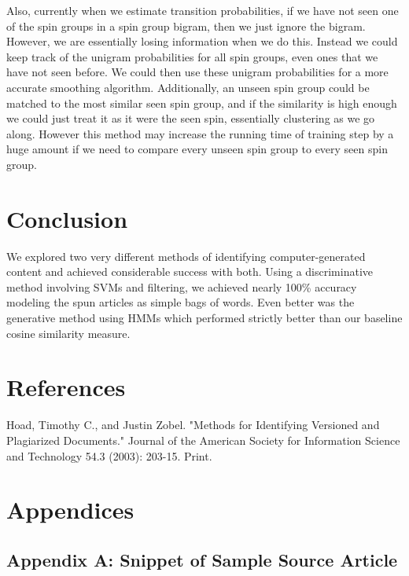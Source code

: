 \documentclass[11pt,letterpaper,oneside, titlepage]{scrartcl}
\begin{document}
Also, currently when we estimate transition probabilities, if we have not seen one of the spin groups in a spin group bigram, then we just ignore the bigram. However, we are essentially losing information when we do this. Instead we could keep track of the unigram probabilities for all spin groups, even ones that we have not seen before. We could then use these unigram probabilities for a more accurate smoothing algorithm. Additionally, an unseen spin group could be matched to the most similar seen spin group, and if the similarity is high enough we could just treat it as it were the seen spin, essentially clustering as we go along. However this method may increase the running time of training step by a huge amount if we need to compare every unseen spin group to every seen spin group.
 

\section{Conclusion}

We explored two very different methods of identifying computer-generated content and achieved considerable success with both.  Using a discriminative method involving SVMs and filtering, we achieved nearly 100\% accuracy modeling the spun articles as simple bags of words.  Even better was the generative method using HMMs which performed strictly better than our baseline cosine similarity measure.

\section{References}

Hoad, Timothy C., and Justin Zobel. "Methods for Identifying Versioned and Plagiarized Documents." Journal of the American Society for Information Science and Technology 54.3 (2003): 203-15. Print.

\section{Appendices}

\subsection{Appendix A: Snippet of Sample Source Article}
\end{document}

